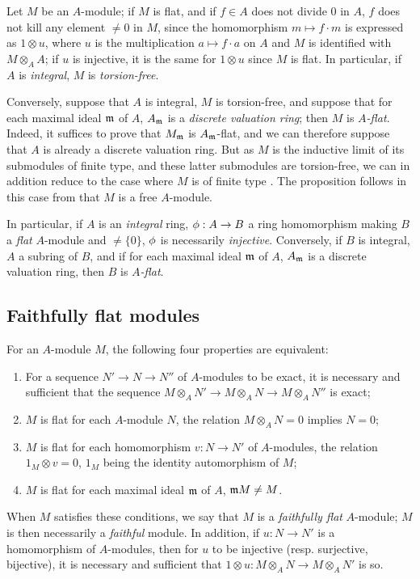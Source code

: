 \begin{env}[6.3.4]
\label{0.6.3.4}
Let $M$ be an $A$-module; if $M$ is flat, and if $f\in A$ does not divide $0$ in $A$, $f$
does not kill any element $\neq 0$ in $M$, since the homomorphism $m\mapsto f\cdot m$ is
expressed as $1\otimes u$, where $u$ is the multiplication $a\mapsto f\cdot a$ on $A$ and
$M$ is identified with $M\otimes_A A$; if $u$ is injective, it is the same for $1\otimes u$
since $M$ is flat. In particular, if $A$ is \emph{integral}, $M$ is \emph{torsion-free}.

Conversely, suppose that $A$ is integral, $M$ is torsion-free, and suppose that for each
maximal ideal $\mathfrak{m}$ of $A$, $A_\mathfrak{m}$ is a \emph{discrete valuation ring};
then $M$ is \emph{$A$-flat}. Indeed, it suffices  to prove that
$M_\mathfrak{m}$ is $A_\mathfrak{m}$-flat, and we can therefore suppose that $A$ is already
a discrete valuation ring. But as $M$ is the inductive limit of its submodules of finite
type, and these latter submodules are torsion-free, we can in addition reduce to the case
where $M$ is of finite type . The proposition follows in this
case from that $M$ is a free $A$-module.

In particular, if $A$ is an \emph{integral} ring, $\vphi:A\to B$ a ring homomorphism making
$B$ a \emph{flat} $A$-module and $\neq\{0\}$, $\phi$ is necessarily \emph{injective}.
Conversely, if $B$ is integral, $A$ a subring of $B$, and if for each maximal ideal
$\mathfrak{m}$ of $A$, $A_\mathfrak{m}$ is a discrete valuation ring, then $B$ is
\emph{$A$-flat}.
\end{env}

\subsection{Faithfully flat modules}
\label{subsection:0.6.4}

\begin{env}[6.4.1]
\label{0.6.4.1}
For an $A$-module $M$, the following four properties are equivalent:
\begin{enumerate}[label=(\alph*)]
  \item For a sequence $N'\to N\to N''$ of $A$-modules to be exact, it is necessary and
    sufficient that the sequence $M\otimes_A N'\to M\otimes_A N\to M\otimes_A N''$ is exact;
  \item $M$ is flat for each $A$-module $N$, the relation $M\otimes_A N=0$ implies $N=0$;
  \item $M$ is flat for each homomorphism $v:N\to N'$ of $A$-modules, the relation
    $1_M\otimes v=0$, $1_M$ being the identity automorphism of $M$;
  \item $M$ is flat for each maximal ideal $\mathfrak{m}$ of $A$, $\mathfrak{m}M\neq M$.
\end{enumerate}

When $M$ satisfies these conditions, we say that $M$ is a \emph{faithfully flat} $A$-module; $M$ is then necessarily a \emph{faithful} module.
In addition, if $u:N\to N'$ is a homomorphism of $A$-modules, then for $u$ to be injective (resp. surjective, bijective), it is necessary and sufficient that $1\otimes u:M\otimes_A N\to M\otimes_A N'$ is so.
\end{env}

